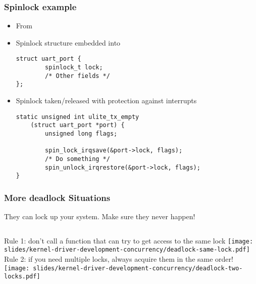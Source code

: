 \begin{frame}[fragile]
  \frametitle{Spinlock example}
  \begin{itemize}
  \item From 
  \item Spinlock structure embedded into 
    \begin{block}{}
    \begin{verbatim}
struct uart_port {
        spinlock_t lock;
        /* Other fields */
};
    \end{verbatim}
    \end{block}
  \item Spinlock taken/released with protection against interrupts
    \begin{block}{}
    \begin{verbatim}
static unsigned int ulite_tx_empty
    (struct uart_port *port) {
        unsigned long flags;

        spin_lock_irqsave(&port->lock, flags);
        /* Do something */
        spin_unlock_irqrestore(&port->lock, flags);
}
    \end{verbatim}
    \end{block}
  \end{itemize}
\end{frame}

\begin{frame}
  \frametitle{More deadlock Situations} They can lock up your system. Make sure they never happen!
  \vspace{0.5cm}
  \begin{columns}
      Rule 1: don't call a function that can try to get access to the same lock
      \texttt{[image: slides/kernel-driver-development-concurrency/deadlock-same-lock.pdf]}
      Rule 2: if you need multiple locks, always acquire them in the same order!
      \texttt{[image: slides/kernel-driver-development-concurrency/deadlock-two-locks.pdf]}
  \end{columns}
\end{frame}

